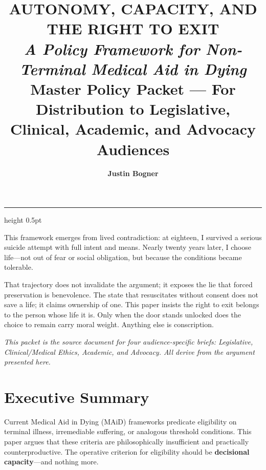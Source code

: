 \documentclass[11pt, letterpaper]{article}
\title{%
  {\sffamily\LARGE\bfseries\color{accent}
    AUTONOMY, CAPACITY, AND THE RIGHT TO EXIT}\\[0.6em]
  {\large\itshape A Policy Framework for Non-Terminal Medical Aid in Dying}\\[0.4em]
  {\normalsize\sffamily\color{midgray} Master Policy Packet — For Distribution to Legislative,
    Clinical, Academic, and Advocacy Audiences}
}
\author{\sffamily\bfseries Justin Bogner}
\date{\sffamily 2026}
\begin{document}

\maketitle
\thispagestyle{empty}

\vspace{0.5em}
{\color{rulegray}\hrule height 0.5pt}
\vspace{1.2em}

\begin{tcolorbox}[policybox, title={\sffamily\bfseries\small\color{accent} Author's Note}]
This framework emerges from lived contradiction: at eighteen, I survived a serious suicide
attempt with full intent and means. Nearly twenty years later, I choose life---not out of
fear or social obligation, but because the conditions became tolerable.

\medskip
That trajectory does not invalidate the argument; it exposes the lie that forced preservation
is benevolence. The state that resuscitates without consent does not save a life; it claims
ownership of one. This paper insists the right to exit belongs to the person whose life it
is. Only when the door stands unlocked does the choice to remain carry moral weight. Anything
else is conscription.

\medskip
\textit{This packet is the source document for four audience-specific briefs: Legislative,
Clinical/Medical Ethics, Academic, and Advocacy. All derive from the argument presented here.}
\end{tcolorbox}

\vspace{1em}

{
\hypersetup{hidelinks}
\tableofcontents
}

\newpage

\section*{Executive Summary}

Current Medical Aid in Dying (MAiD) frameworks predicate eligibility on terminal illness,
irremediable suffering, or analogous threshold conditions. This paper argues that these
criteria are philosophically insufficient and practically counterproductive. The operative
criterion for eligibility should be \textbf{decisional capacity}---and nothing more.
\end{document}
